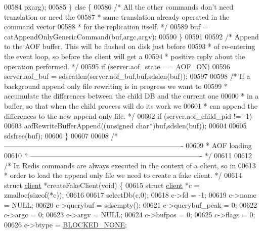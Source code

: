 \begin{DoxyCode}
{{{{{{{{{00584                                                pxarg);
00585     \} \textcolor{keywordflow}{else} \{
00586         \textcolor{comment}{/* All the other commands don't need translation or need the}
00587 \textcolor{comment}{         * same translation already operated in the command vector}
00588 \textcolor{comment}{         * for the replication itself. */}
00589         buf = catAppendOnlyGenericCommand(buf,argc,argv);
00590     \}
00591 
00592     \textcolor{comment}{/* Append to the AOF buffer. This will be flushed on disk just before}
00593 \textcolor{comment}{     * of re-entering the event loop, so before the client will get a}
00594 \textcolor{comment}{     * positive reply about the operation performed. */}
00595     \textcolor{keywordflow}{if} (server.aof\_state == \hyperlink{server_8h_af6b151c9dced28e94c19479197113a83}{AOF\_ON})
00596         server.aof\_buf = sdscatlen(server.aof\_buf,buf,sdslen(buf));
00597 
00598     \textcolor{comment}{/* If a background append only file rewriting is in progress we want to}
00599 \textcolor{comment}{     * accumulate the differences between the child DB and the current one}
00600 \textcolor{comment}{     * in a buffer, so that when the child process will do its work we}
00601 \textcolor{comment}{     * can append the differences to the new append only file. */}
00602     \textcolor{keywordflow}{if} (server.aof\_child\_pid != -1)
00603         aofRewriteBufferAppend((\textcolor{keywordtype}{unsigned} \textcolor{keywordtype}{char}*)buf,sdslen(buf));
00604 
00605     sdsfree(buf);
00606 \}
00607 
00608 \textcolor{comment}{/* ----------------------------------------------------------------------------}
00609 \textcolor{comment}{ * AOF loading}
00610 \textcolor{comment}{ * ------------------------------------------------------------------------- */}
00611 
00612 \textcolor{comment}{/* In Redis commands are always executed in the context of a client, so in}
00613 \textcolor{comment}{ * order to load the append only file we need to create a fake client. */}
00614 \textcolor{keyword}{struct} \hyperlink{structclient}{client} *createFakeClient(\textcolor{keywordtype}{void}) \{
00615     \textcolor{keyword}{struct} \hyperlink{structclient}{client} *c = zmalloc(\textcolor{keyword}{sizeof}(*c));
00616 
00617     selectDb(c,0);
00618     c->fd = -1;
00619     c->name = NULL;
00620     c->querybuf = sdsempty();
00621     c->querybuf\_peak = 0;
00622     c->argc = 0;
00623     c->argv = NULL;
00624     c->bufpos = 0;
00625     c->flags = 0;
00626     c->btype = \hyperlink{server_8h_a89cf259b265c26cd1e09de67ade457dc}{BLOCKED\_NONE};
}}}}}}}}}
\end{DoxyCode}
